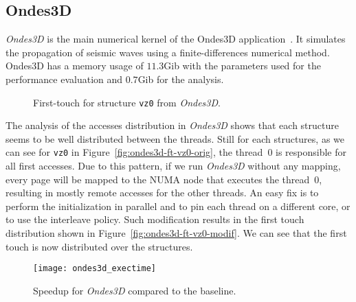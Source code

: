 \subsection{Ondes3D}
\label{sec:exp-ondes3d}

\emph{Ondes3D} is the main numerical kernel of the Ondes3D
application~\cite{Dupros2008}. It simulates the propagation of seismic waves
using a finite-differences numerical method. Ondes3D has a memory usage of
$11.3$Gib with the parameters used for the performance evaluation and $0.7$Gib
for the analysis.

\begin{figure}[htb]
    \centering

    \caption{First-touch for structure
        \texttt{vz0} from \emph{Ondes3D}.} %
    \label{fig:ondes3d}
\end{figure}

The analysis of the accesses distribution in \emph{Ondes3D} shows that each
structure seems to be well distributed between the threads. %
Still for each structures, as we can see for \texttt{vz0} in
Figure~\ref{fig:ondes3d-ft-vz0-orig}, the
thread~$0$ is responsible for all first accesses. Due to
this pattern, if we run \emph{Ondes3D} without any mapping, every page will be
mapped to the NUMA node that executes the thread~$0$, resulting in mostly remote
accesses for the other threads. An easy fix is to perform the initialization
in parallel and to pin each thread on a different core, or to use the
interleave policy.
Such modification results in the first touch distribution shown in
Figure~\ref{fig:ondes3d-ft-vz0-modif}. We can see that the first touch is now distributed
over the structures.

\begin{figure}[htb]
    \centering
    \texttt{[image: ondes3d\_exectime]}
    \caption{Speedup for \emph{Ondes3D} compared to the baseline.}
    \label{fig:ondes-res}
\end{figure}

